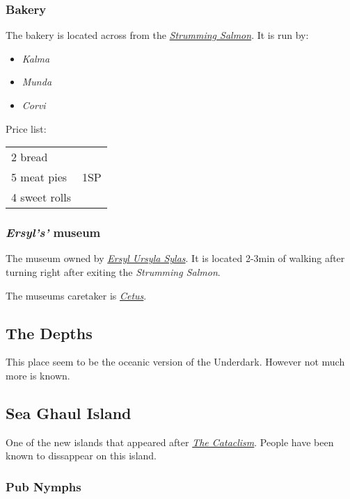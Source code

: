 \documentclass{article}
\begin{document}
\begin{multicols}{2}
    \subsubsection{Bakery}
    \label{bakery}

    The bakery is located across from the \hyperref[strumming_salmon]{\textit{Strumming Salmon}}. It is run by:

    \begin{itemize}
        \item \textit{Kalma}
        \item \textit{Munda}
        \item \textit{Corvi}
    \end{itemize}

    Price list:

    \begin{tabular}{l r}
        2 bread & \multirow{3}{1cm}{1SP} \\
        5 meat pies                      \\
        4 sweet rolls
    \end{tabular}

    \subsubsection{ \textit{Ersyl's'} museum}
    \label{museum}

    The museum owned by \hyperref[ersyl]{\textit{Ersyl Ursyla Sylas}}. It is located 2-3min of walking after turning right after exiting the \textit{Strumming Salmon}.

    The museums caretaker is \hyperref[cetus]{\textit{Cetus}}.

    \subsection{The Depths}
    \label{depths}

    This place seem to be the oceanic version of the Underdark. However not much more is known.

    \subsection{Sea Ghaul Island}
    \label{sea_ghaul_island}

    One of the new islands that appeared after \hyperref[cataclism]{\textit{The Cataclism}}. People have been known to dissappear on this island.

    \subsubsection{Pub Nymphs}
    \label{nymphs}


\end{multicols}
\end{document}
